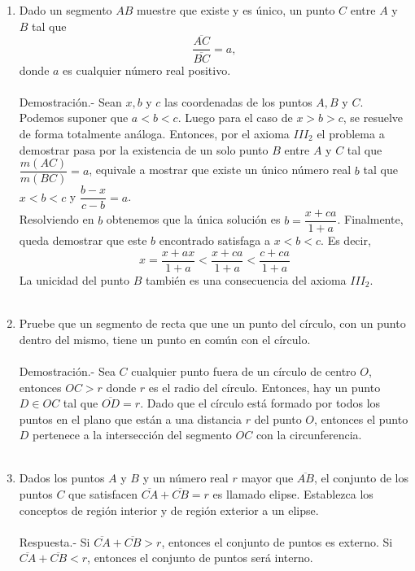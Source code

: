 \documentclass[10pt]{article}
\begin{document}
\begin{enumerate}
	\item Dado un segmento $AB$ muestre que existe y es único, un punto $C$ entre $A$ y $B$ tal que $$\dfrac{\overline{AC}}{\overline{BC}}=a,$$ donde $a$ es cualquier número real positivo.\\\\
	Demostración.-\; Sean $x, b$ y $c$ las coordenadas de los puntos $A, B$ y $C$. Podemos suponer que $a <b <c$. Luego para el caso de $x> b> c$, se resuelve de forma totalmente análoga. Entonces, por el axioma $III_2$ el problema a demostrar pasa por la existencia de un solo punto $B$ entre $A$ y $C$ tal que $\dfrac{m(AC)}{m(BC)}=a$, equivale a mostrar que existe un único número real $b$ tal que $x<b<c$ y $\dfrac{b-x}{c-b}=a$.\\
	Resolviendo en $b$ obtenemos que la única solución es $b=\dfrac{x+ca}{1+a}$. Finalmente, queda demostrar que este $b$ encontrado satisfaga a $x<b<c$. Es decir,
	$$x=\dfrac{x+ax}{1+a}<\dfrac{x+ca}{1+a}<\dfrac{c+ca}{1+a}$$
	La unicidad del punto $B$ también es una consecuencia del axioma $III_2$.\\\\

	\item Pruebe que un segmento de recta que une un punto del círculo, con un punto dentro del mismo, tiene un punto en común con el círculo.\\\\
	Demostración.-\; Sea $C$ cualquier punto fuera de un círculo de centro $O$, entonces $OC> r$ donde $r$ es el radio del círculo. Entonces, hay un punto $D \in OC$ tal que $\overline{OD} = r$. Dado que el círculo está formado por todos los puntos en el plano que están a una distancia $r$ del punto $O$, entonces el punto $D$ pertenece a la intersección del segmento $OC$ con la circunferencia.\\\\

	\item Dados los puntos $A$ y $B$ y un número real $r$ mayor que $\overline{AB}$, el conjunto de los puntos $C$ que satisfacen $\overline{CA}+\overline{CB}=r$ es llamado elipse. Establezca los conceptos de región interior y de región exterior a un elipse.\\\\
	Respuesta.-\; Si $\overline{CA} + \overline{CB}> r$, entonces el conjunto de puntos es externo. Si $\overline{CA} + \overline{CB} <r$, entonces el conjunto de puntos será interno.\\\\


\end{enumerate}
\end{document}
